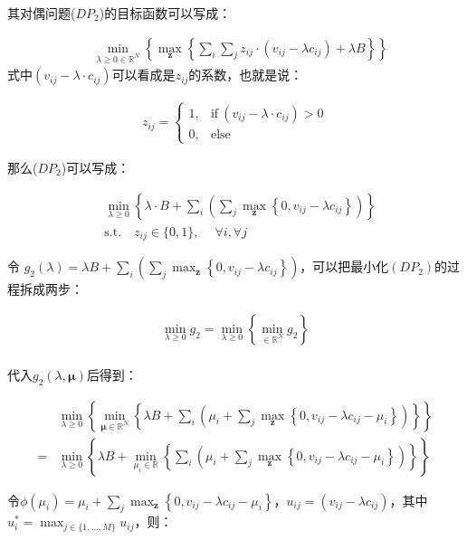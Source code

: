 \documentclass[12pt, a4paper]{article}
\begin{document}
其对偶问题($DP_2$)的目标函数可以写成：

\begin{align}
    & \min_{\lambda \geq 0 \in \mathbb R^N}\left\{ \max_{\bm z}\left\{  \sum_i\sum_j z_{ij} \cdot \left(v_{ij} - \lambda c_{ij}   \right)  +\lambda B \right\}  \right\}
\end{align}
式中$(v_{ij} - \lambda \cdot c_{ij} )$可以看成是$z_{ij}$的系数，也就是说：

\begin{align}
    z_{ij} = \begin{cases}
    1,& \text{if}\ (v_{ij} - \lambda \cdot c_{ij} )>0\\
    0,& \text{else}
    \end{cases}
\end{align}

那么($DP_2$)可以写成：

\begin{align}
    & \min_{\lambda \geq 0 }\left\{ \lambda \cdot B+\sum_i\left(  \sum_j\max_{\bm z}\left\{0,v_{ij}-\lambda c_{ij} \right\} \right)\right\}\\
    & \text{s.t.} \quad z_{ij} \in \{0,1\} ,\quad\ \forall i,\forall j
\end{align}

令 $g_2 (\lambda) =\lambda B+\sum_i\left(  \sum_j\max_{\bm z}\left\{0,v_{ij}-\lambda c_{ij} \right\} \right) $，可以把最小化$(DP_2)$的过程拆成两步：

\begin{align}
       \min_{\lambda \geq 0} g_2  = \min_{\lambda\geq 0} \left\{ \min_{ \in \mathbb R^N} g_2 \right\}\\
\end{align}

代入$g_2(\lambda,\bm \mu)$后得到：

\begin{align}
    &\min_{\lambda \geq 0} \left\{\min_{\bm \mu\in\mathbb R^N}\left\{ \lambda B+\sum_i\left( \mu_i +\sum_j\max_{\bm z}\left\{0,v_{ij}-\lambda c_{ij}-\mu_i \right\} \right) \right\}  \right \}\\
    =& \min_{\lambda\geq 0} \left\{\lambda B + \min_{\mu_i \in \mathbb R} \left\{ \sum_i\left( \mu_i +\sum_j\max_{\bm z}\left\{0,v_{ij}-\lambda c_{ij}-\mu_i \right\} \right) \right\}\right\}\label{eq:min_min}
\end{align}

令$\phi(\mu_i) = \mu_i +\sum_j\max_{\bm z}\left\{0,v_{ij}-\lambda c_{ij}-\mu_i \right\}$，$u_{ij} = (v_{ij} - \lambda c_{ij})$，其中$u^*_i = \max_{j \in \{1,\ldots, M\}} u_{ij}$，则：
\end{document}
